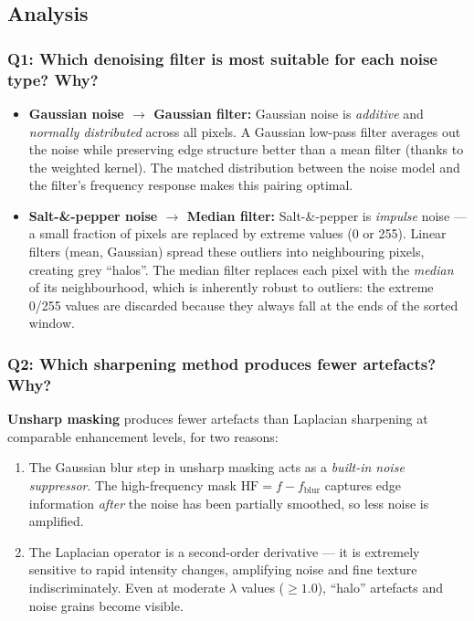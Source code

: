 \documentclass[12pt,a4paper]{article}
\begin{document}
\subsection{Analysis}

\subsubsection{Q1: Which denoising filter is most suitable for each noise type? Why?}

\begin{itemize}[leftmargin=*]
  \item \textbf{Gaussian noise $\to$ Gaussian filter:} Gaussian noise is \emph{additive} and \emph{normally distributed} across all pixels. A Gaussian low-pass filter averages out the noise while preserving edge structure better than a mean filter (thanks to the weighted kernel). The matched distribution between the noise model and the filter's frequency response makes this pairing optimal.

  \item \textbf{Salt-\&-pepper noise $\to$ Median filter:} Salt-\&-pepper is \emph{impulse} noise --- a small fraction of pixels are replaced by extreme values (0 or 255). Linear filters (mean, Gaussian) spread these outliers into neighbouring pixels, creating grey ``halos''. The median filter replaces each pixel with the \emph{median} of its neighbourhood, which is inherently robust to outliers: the extreme 0/255 values are discarded because they always fall at the ends of the sorted window.
\end{itemize}

\subsubsection{Q2: Which sharpening method produces fewer artefacts? Why?}

\textbf{Unsharp masking} produces fewer artefacts than Laplacian sharpening at comparable enhancement levels, for two reasons:

\begin{enumerate}
  \item The Gaussian blur step in unsharp masking acts as a \emph{built-in noise suppressor}. The high-frequency mask $\text{HF} = f - f_\text{blur}$ captures edge information \emph{after} the noise has been partially smoothed, so less noise is amplified.

  \item The Laplacian operator is a second-order derivative --- it is extremely sensitive to rapid intensity changes, amplifying noise and fine texture indiscriminately. Even at moderate $\lambda$ values ($\geq 1.0$), ``halo'' artefacts and noise grains become visible.
\end{enumerate}
\end{document}
